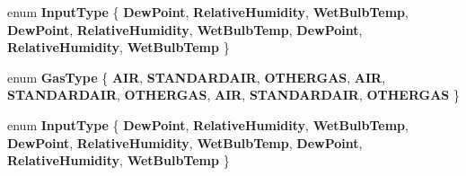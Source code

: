 \begin{DoxyCompactItemize}
enum {\bfseries Input\+Type} \{ \newline
{\bfseries Dew\+Point}, 
{\bfseries Relative\+Humidity}, 
{\bfseries Wet\+Bulb\+Temp}, 
{\bfseries Dew\+Point}, 
\newline
{\bfseries Relative\+Humidity}, 
{\bfseries Wet\+Bulb\+Temp}, 
{\bfseries Dew\+Point}, 
{\bfseries Relative\+Humidity}, 
\newline
{\bfseries Wet\+Bulb\+Temp}
 \}
\item 
\mbox{\label{class_base_gas_density_afb215e48f6193462521b7e8d47306ed3}} 
enum {\bfseries Gas\+Type} \{ \newline
{\bfseries A\+IR}, 
{\bfseries S\+T\+A\+N\+D\+A\+R\+D\+A\+IR}, 
{\bfseries O\+T\+H\+E\+R\+G\+AS}, 
{\bfseries A\+IR}, 
\newline
{\bfseries S\+T\+A\+N\+D\+A\+R\+D\+A\+IR}, 
{\bfseries O\+T\+H\+E\+R\+G\+AS}, 
{\bfseries A\+IR}, 
{\bfseries S\+T\+A\+N\+D\+A\+R\+D\+A\+IR}, 
\newline
{\bfseries O\+T\+H\+E\+R\+G\+AS}
 \}
\item 
\mbox{\label{class_base_gas_density_a54f846cc4683a49d3904a40fe2986772}} 
enum {\bfseries Input\+Type} \{ \newline
{\bfseries Dew\+Point}, 
{\bfseries Relative\+Humidity}, 
{\bfseries Wet\+Bulb\+Temp}, 
{\bfseries Dew\+Point}, 
\newline
{\bfseries Relative\+Humidity}, 
{\bfseries Wet\+Bulb\+Temp}, 
{\bfseries Dew\+Point}, 
{\bfseries Relative\+Humidity}, 
\newline
{\bfseries Wet\+Bulb\+Temp}
 \}
\end{DoxyCompactItemize}
